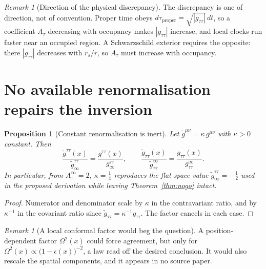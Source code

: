\documentclass[12pt,a4paper]{article}
\newtheorem{proposition}[theorem]{Proposition}
\theoremstyle{remark}
\newtheorem{remark}[theorem]{Remark}
\theoremstyle{definition}
\begin{document}
    \begin{remark}[Direction of the physical discrepancy]
      \label{rem:physical}
      The discrepancy is one of direction, not of convention.
      Proper time obeys $d\tau_{\mathrm{proper}}=\sqrt{|g_{\tau\tau}|}\,dt$, so a coefficient
      $A_{\tau}$ decreasing with occupancy makes $|g_{\tau\tau}|$ increase, and local clocks run
      faster near an occupied region.
      A Schwarzschild exterior requires the opposite: there $|g_{\tau\tau}|$ decreases with
      $r_{s}/r$, so $A_{\tau}$ must increase with occupancy.
    \end{remark}

  \section{No available renormalisation repairs the inversion}
    \label{sec:renorm}

    \begin{proposition}[Constant renormalisation is inert]
      \label{prop:constant-renorm}
      Let $\widetilde g^{\mu\nu}=\kappa\,g^{\mu\nu}$ with $\kappa>0$ constant.
      Then
      \[
        \frac{\widetilde g^{\tau\tau}(x)}{\widetilde g^{\tau\tau}_{\infty}}
        =\frac{g^{\tau\tau}(x)}{g^{\tau\tau}_{\infty}},
        \qquad
        \frac{\widetilde g_{\tau\tau}(x)}{\widetilde g_{\tau\tau}^{\infty}}
        =\frac{g_{\tau\tau}(x)}{g_{\tau\tau}^{\infty}} .
      \]
      In particular, from $A_{\tau}^{\infty}=2$, $\kappa=\tfrac14$ reproduces the flat-space value
      $\widetilde g^{\tau\tau}_{\infty}=-\tfrac12$ used in the proposed derivation while leaving
      Theorem~\ref{thm:nogo} intact.
    \end{proposition}

    \begin{proof}
      Numerator and denominator scale by $\kappa$ in the contravariant ratio, and by $\kappa^{-1}$ in
      the covariant ratio since $\widetilde g_{\tau\tau}=\kappa^{-1}g_{\tau\tau}$.
      The factor cancels in each case.
    \end{proof}

    \begin{remark}[A local conformal factor would beg the question]
      \label{rem:local-renorm}
      A position-dependent factor $\Omega^{2}(x)$ could force agreement, but only for
      $\Omega^{2}(x)\propto\bigl(1-\epsilon(x)\bigr)^{-2}$, a law read off the desired conclusion.
      It would also rescale the spatial components, and it appears in no source paper.
    \end{remark}
\end{document}
